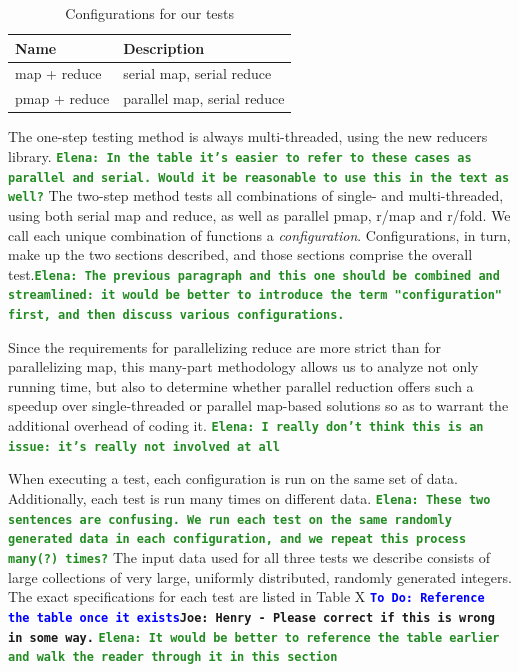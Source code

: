 \documentclass[12pt]{article}
\newcommand{\comment}[1]{{\bf \tt  {#1}}}
\newcommand{\emcomment}[1]{\textcolor{ForestGreen}{\comment{Elena: {#1}}}}
\newcommand{\joecomment}[1]{\textcolor{JoesGold}{\comment{Joe: {#1}}}}
\newcommand{\todo}[1]{\textcolor{blue}{\comment{To Do: {#1}}}}
\begin{document}
\begin{table}
\begin{center}
\begin{tabular}{|l|l|}
\hline 
Name & Description \\
\hline
map + reduce & serial map, serial reduce \\
pmap + reduce & parallel map, serial reduce \\
\hline
\end{tabular}
\end{center}
\caption{Configurations for our tests}\label{table:tests}
\end{table}

The one-step testing method is always multi-threaded, using the new reducers library. \emcomment{In the table it's easier to refer to these cases as parallel and serial. Would it be reasonable to use this in the text as well?} The two-step method tests all combinations of single- and multi-threaded, using both serial map and reduce, as well as parallel pmap, r/map and r/fold. We call each unique combination of functions a \emph{configuration}. Configurations, in turn, make up the two sections described, and those sections comprise the overall test.\emcomment{The previous paragraph and this one should be combined and streamlined: it would be better to introduce the term "configuration" first, and then discuss various configurations.}

Since the requirements for parallelizing reduce are more strict than for parallelizing map, this many-part methodology allows us to analyze not only running time, but also to determine whether parallel reduction offers such a speedup over single-threaded or parallel map-based solutions so as to warrant the additional overhead of coding it. \emcomment{I really don't think this is an issue: it's really not involved at all}

When executing a test, each configuration is run on the same set of data. Additionally, each test is run many times on different data.
\emcomment{These two sentences are confusing. We run each test on the same randomly generated data in each configuration, and we repeat this process many(?) times?} 
The input data used for all three tests we describe consists of large collections of very large, uniformly distributed, randomly generated integers. The exact specifications for each test are listed in Table X \todo{Reference the table once it exists}\joecomment{Henry - Please correct if this is wrong in some way.}
\emcomment{It would be better to reference the table earlier and walk the reader through it in this section}
\end{document}
